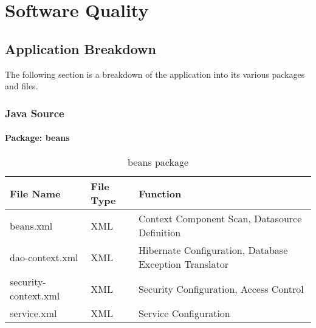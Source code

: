 \chapter{Software Quality}
\label{squality}

\section{Application Breakdown}

The following section is a breakdown of the application into its various packages and files.
\subsection{Java Source}
\subsubsection{Package: beans}
\begin{table}[H]
\begin{center}
    \begin{tabular}{| l | l | p{5cm} |}
    \hline
    File Name & File Type & Function\\ \hline
    beans.xml & XML & Context Component Scan, Datasource Definition \\ \hline
	dao-context.xml & XML & Hibernate Configuration, Database Exception Translator \\ \hline
	security-context.xml & XML & Security Configuration, Access Control \\ \hline
	service.xml & XML & Service Configuration \\ \hline
    \end{tabular}
\end{center}
\caption{beans package}
\end{table}

